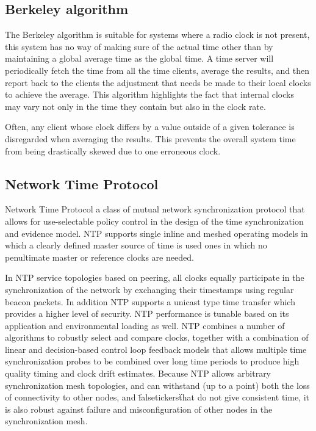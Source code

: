 \subsection{Berkeley algorithm}
The Berkeley algorithm is suitable for systems where a radio clock is not present, this system has no way of making sure of the actual time other than by maintaining a global average time as the global time. A time server will periodically fetch the time from all the time clients, average the results, and then report back to the clients the adjustment that needs be made to their local clocks to achieve the average. This algorithm highlights the fact that internal clocks may vary not only in the time they contain but also in the clock rate.

Often, any client whose clock differs by a value outside of a given tolerance is disregarded when averaging the results. This prevents the overall system time from being drastically skewed due to one erroneous clock.

\subsection{Network Time Protocol}
Network Time Protocol a class of mutual network synchronization protocol that allows for use-selectable policy control in the design of the time synchronization and evidence model. NTP supports single inline and meshed operating models in which a clearly defined master source of time is used ones in which no penultimate master or reference clocks are needed.

In NTP service topologies based on peering, all clocks equally participate in the synchronization of the network by exchanging their timestamps using regular beacon packets. In addition NTP supports a unicast type time transfer which provides a higher level of security. NTP performance is tunable based on its application and environmental loading as well. NTP combines a number of algorithms to robustly select and compare clocks, together with a combination of linear and decision-based control loop feedback models that allows multiple time synchronization probes to be combined over long time periods to produce high quality timing and clock drift estimates. Because NTP allows arbitrary synchronization mesh topologies, and can withstand (up to a point) both the loss of connectivity to other nodes, and \"falsetickers\" that do not give consistent time, it is also robust against failure and misconfiguration of other nodes in the synchronization mesh.

